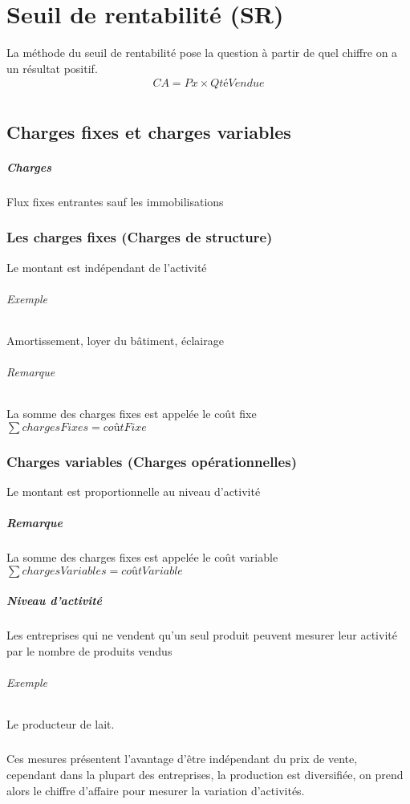 \documentclass[12pt,a4paper,openany]{report}
\begin{document}
	\maketitle
	\chapter{Seuil de rentabilité (SR)}
	La méthode du seuil de rentabilité pose la question à partir de quel chiffre on a un résultat positif.
	\begin{eqnarray*}
		CA = Px \times QtéVendue\\
	\end{eqnarray*}
	\section{Charges fixes et charges variables}
	\paragraph{Charges} Flux fixes entrantes sauf les immobilisations

	\subsection{Les charges fixes (Charges de structure)}
	Le montant est indépendant de l'activité
	\subparagraph{Exemple} Amortissement, loyer du bâtiment, éclairage
	\subparagraph{Remarque} La somme des charges fixes est appelée le coût fixe \\ $\sum{chargesFixes} = coûtFixe$ 

	\subsection{Charges variables (Charges opérationnelles)}
	Le montant est proportionnelle au niveau d'activité
	\paragraph{Remarque} La somme des charges fixes est appelée le coût variable \\ $\sum{chargesVariables} = coûtVariable$
	\paragraph{Niveau d'activité} Les entreprises qui ne vendent qu'un seul produit peuvent mesurer leur activité par le nombre de produits vendus
	\subparagraph{Exemple} Le producteur de lait. 
	\paragraph{} Ces mesures présentent l'avantage d'être indépendant du prix de vente, cependant dans la plupart des entreprises, la production est diversifiée, 
	on prend alors le chiffre d'affaire pour mesurer la variation d'activités.
\end{document}
